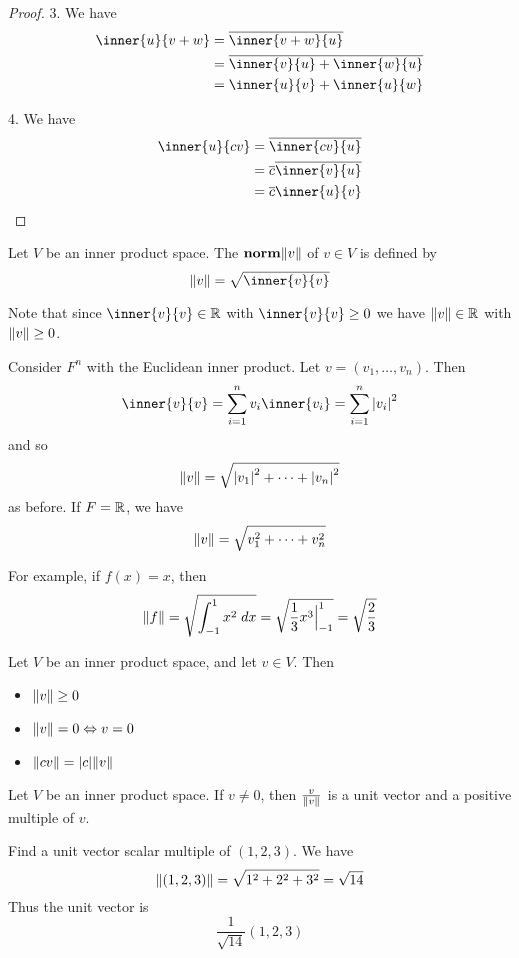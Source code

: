 \documentclass{article}
\begin{document}
    \begin{proof}
      3. We have
      \begin{align*}
        \inner{u}{v+w} &= \overline{\inner{v+w}{u}}\\
        &= \overline{\inner{v}{u} + \inner{w}{u}}\\
        &= \inner{u}{v} + \inner{u}{w}\\
      \end{align*}

      4. We have
      \begin{align*}
        \inner{u}{cv} &= \overline{\inner{cv}{u}}\\
        &= \overline{c}\overline{\inner{v}{u}}\\
        &= \overline{c}\inner{u}{v}
      \end{align*}
    \end{proof}
    \begin{definition}
      Let $V$ be an inner product space. The $\textbf{norm} \norm{v}$ of $v \in V$ is defined by \[
        \norm{v} = \sqrt{\inner{v}{v}}
      \]

      Note that since $\inner{v}{v} \in \R$ with $\inner{v}{v} \geq 0$ we have $\norm{v} \in \mathbb{R}$ with $\norm{v} \geq 0$.
    \end{definition}
    \begin{example}
      Consider $F^n$ with the Euclidean inner product. Let $v = (v_1, \ldots, v_n)$. Then \[
        \inner{v}{v} = \sum_{i=1}^n v_i\inner{v_i} = \sum_{i=1}^n \abs{v_i}^2
      \] and so \[
        \norm{v} = \sqrt{\abs{v_1}^2 + \dots + \abs{v_n}^2}
      \] as before. If $F = \mathbb{R}$, we have \[
        \norm{v} = \sqrt{v_1^2 + \dots + v_n^2}
      \]

      For example, if $f(x) = x$, then \[
        \norm{f} = \sqrt{\int_{-1}^1 x^2 \; dx} = \sqrt{\frac{1}{3}x^3\Big|_{-1}^1} = \sqrt{\frac{2}{3}}
      \]
    \end{example}
    \begin{theorem}
      Let $V$ be an inner product space, and let $v \in V$. Then
      \begin{itemize}
        \item $\norm{v} \geq 0$
        \item $\norm{v} = 0 \Leftrightarrow v = 0$
        \item $\norm{cv} = \abs{c}\norm{v}$
      \end{itemize}
    \end{theorem}
    \begin{theorem}
      Let $V$ be an inner product space. If $v \neq 0$, then $\frac{v}{\norm{v}}$ is a unit vector and a positive multiple of $v$.
    \end{theorem}
    \begin{example}
      Find a unit vector scalar multiple of $(1, 2, 3)$.
      We have \[
        \norm{(1, 2, 3)} = \sqrt{1^2 + 2^2 + 3^2} = \sqrt{14}
      \]
      Thus the unit vector is \[
        \frac{1}{\sqrt{14}}(1, 2, 3)
      \]
    \end{example}
\end{document}
